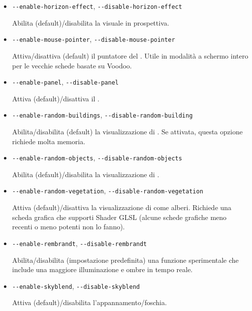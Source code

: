 {\begin{itemize}
  Attiva/disattiva la  per le schede grafiche 3Dfx.

  \item{\texttt{-$ $-enable-horizon-effect}, \texttt{-$ $-disable-horizon-effect}}

  Abilita (default)/disabilita la visuale in prospettiva.

  \item{\texttt{-$ $-enable-mouse-pointer}, \texttt{-$ $-disable-mouse-pointer}}

  Attiva/disattiva (default) il puntatore del . Utile in modalit\`{a} a schermo intero per le vecchie schede basate su Voodoo.

  \item{\texttt{-$ $-enable-panel}, \texttt{-$ $-disable-panel}}

  Attiva (default)/disattiva il .

  \item{\texttt{-$ $-enable-random-buildings}, \texttt{-$ $-disable-random-building}}

  Abilita/disabilita (default) la visualizzazione di .
  Se attivata, questa opzione richiede molta memoria.

  \item{\texttt{-$ $-enable-random-objects}, \texttt{-$ $-disable-random-objects}}

  Abilita (default)/disabilita la visualizzazione di .

  \item{\texttt{-$ $-enable-random-vegetation}, \texttt{-$ $-disable-random-vegetation}}

  Attiva (default)/disattiva la visualizzazione di  come alberi.
  Richiede una scheda grafica che supporti Shader GLSL (alcune schede grafiche meno
  recenti o meno potenti non lo fanno).

  \item{\texttt{-$ $-enable-rembrandt}, \texttt{-$ $-disable-rembrandt}}

  Abilita/disabilita (impostazione predefinita) una funzione sperimentale che
  include una maggiore illuminazione e ombre in tempo reale.

  \item{\texttt{-$ $-enable-skyblend}, \texttt{-$ $-disable-skyblend}}

  Attiva (default)/disabilita l'appannamento/foschia.


\end{itemize}}
